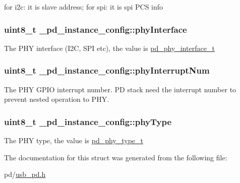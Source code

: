 for i2c\-: it is slave address; for spi\-: it is spi P\-C\-S info \hypertarget{struct__pd__instance__config_acb93f9cec67a95c40730be43c80d3214}{
\subsubsection[{phy\-Interface}]{\setlength{\rightskip}{0pt plus 5cm}uint8\-\_\-t \-\_\-pd\-\_\-instance\-\_\-config\-::phy\-Interface}}\label{struct__pd__instance__config_acb93f9cec67a95c40730be43c80d3214}
The P\-H\-Y interface (I2\-C, S\-P\-I etc), the value is \hyperlink{group__usb__pd__stack_ga0499cb1eb2ad70e8d155ff72b50c7a38}{pd\-\_\-phy\-\_\-interface\-\_\-t} \hypertarget{struct__pd__instance__config_a131f930f58f1a9bfe1488acb62aa2725}{
\subsubsection[{phy\-Interrupt\-Num}]{\setlength{\rightskip}{0pt plus 5cm}uint8\-\_\-t \-\_\-pd\-\_\-instance\-\_\-config\-::phy\-Interrupt\-Num}}\label{struct__pd__instance__config_a131f930f58f1a9bfe1488acb62aa2725}
The P\-H\-Y G\-P\-I\-O interrupt number. P\-D stack need the interrupt number to prevent nested operation to P\-H\-Y. \hypertarget{struct__pd__instance__config_a1f5e597bbfc0af871a5e887c34eb3aca}{
\subsubsection[{phy\-Type}]{\setlength{\rightskip}{0pt plus 5cm}uint8\-\_\-t \-\_\-pd\-\_\-instance\-\_\-config\-::phy\-Type}}\label{struct__pd__instance__config_a1f5e597bbfc0af871a5e887c34eb3aca}
The P\-H\-Y type, the value is \hyperlink{group__usb__pd__stack_gaafe9b09173bbffaa5075085b0dab18ec}{pd\-\_\-phy\-\_\-type\-\_\-t} 

The documentation for this struct was generated from the following file\-:\begin{DoxyCompactItemize}
\item 
pd/\hyperlink{usb__pd_8h}{usb\-\_\-pd.\-h}\end{DoxyCompactItemize}
